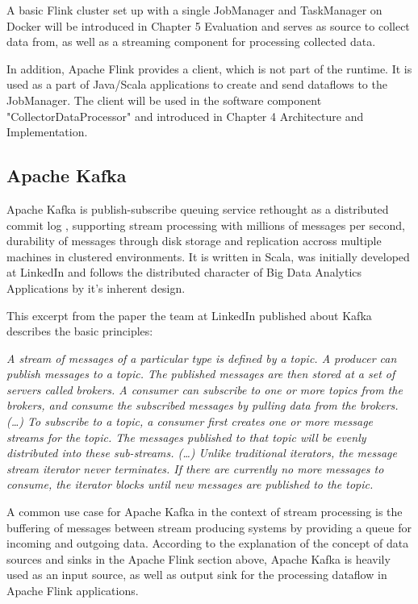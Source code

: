 A basic Flink cluster set up with a single JobManager and TaskManager on Docker will be introduced in
Chapter 5 Evaluation and serves as source to collect data from, as well as a streaming component for
processing collected data.

In addition, Apache Flink provides a client, which is not part of the runtime. It is used as a part
of Java/Scala applications to create and send dataflows to the JobManager. The client will
be used in the software component "CollectorDataProcessor" and introduced in Chapter 4 Architecture
and Implementation.

\subsection{Apache Kafka}

Apache Kafka is publish-subscribe queuing service rethought as a distributed commit log \cite{Kafka16},
supporting stream processing with millions of messages per second, durability of messages through disk
storage and replication accross multiple machines in clustered environments. It is written in Scala, was
initially developed at LinkedIn and follows the distributed character of Big Data Analytics Applications
by it's inherent design.

This excerpt from the paper \cite{Neha11} the team at LinkedIn published about Kafka describes the
basic principles:

\textit{A stream of messages of a particular type is defined by a topic. A producer can publish
messages to a topic. The published messages are then stored at a set of servers called brokers.
A consumer can subscribe to one or more topics from the brokers, and consume the subscribed
messages by pulling data from the brokers. (…) To subscribe to a topic, a consumer first creates
one or more message streams for the topic. The messages published to that topic will be evenly
distributed into these sub-streams. (…)  Unlike traditional iterators, the message stream iterator
never terminates. If there are currently no more messages to consume, the iterator blocks until
new messages are published to the topic.}

A common use case for Apache Kafka in the context of stream processing is the buffering of messages
between stream producing systems by providing a queue for incoming and outgoing data. According
to the explanation of the concept of data sources and sinks in the Apache Flink section above, Apache Kafka
is heavily used as an input source, as well as output sink for the processing dataflow in Apache Flink
applications.


